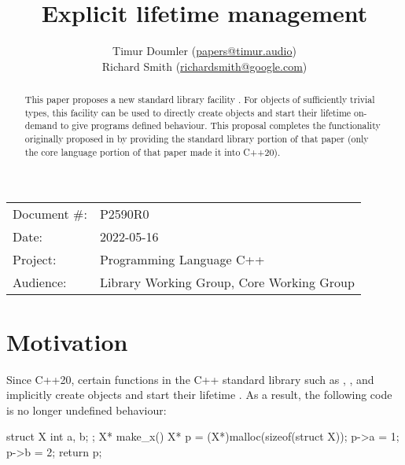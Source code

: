

\newcommand{\forceindent}{\parindent=1em\indent\parindent=0pt\relax} %


\title{Explicit lifetime management}
\author{
  Timur Doumler \small(\href{mailto:papers@timur.audio}{papers@timur.audio}) \\
  Richard Smith \small(\href{mailto:richardsmith@google.com}{richardsmith@google.com})
}
\date{}
\maketitle

\begin{tabular}{ll}
Document \#: & P2590R0 \\
Date: & 2022-05-16\\
Project: & Programming Language C++ \\
Audience: & Library Working Group, Core Working Group
\end{tabular}


\begin{abstract}
This paper proposes a new standard library facility . For objects of sufficiently trivial types, this facility can be used to directly create objects and start their lifetime on-demand to give programs defined behaviour. This proposal completes the functionality originally proposed in \cite{P0593R6} by providing the standard library portion of that paper (only the core language portion of that paper made it into C++20).
\end{abstract}

\vspace{5mm}

\section{Motivation}
\label{sec:motivation}

Since C++20, certain functions in the C++ standard library such as , , and  implicitly create objects and start their lifetime \cite{P0593R6}. As a result, the following code is no longer undefined behaviour:

\begin{codeblock}
struct X { int a, b; };
X* make_x() {
  X* p = (X*)malloc(sizeof(struct X));
  p->a = 1;
  p->b = 2;
  return p;
}
\end{codeblock}

